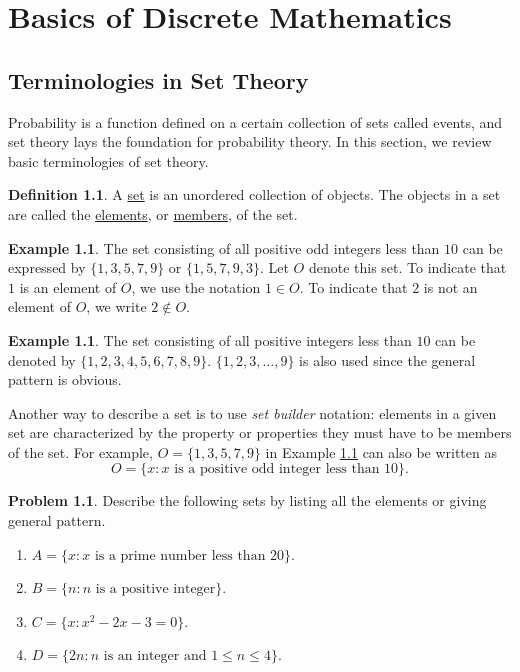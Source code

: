 \documentclass[12pt,letterpaper]{book}
\numberwithin{equation}{section}
\theoremstyle{definition}
\newtheorem{defi}[thm]{\textbf{Definition}}
\newtheorem{problem}[thm]{\textbf{Problem}}
\newtheorem{example}[thm]{\textbf{Example}}
\begin{document}
\chapter{Basics of Discrete Mathematics}

\section{Terminologies in Set Theory}

Probability is a function defined on a certain collection of sets called events, and set theory lays the foundation for probability theory. In this section, we review basic terminologies of set theory.

\begin{defi}
A \underline{set} is an unordered collection of objects. The objects in a set are called the \underline{elements}, or \underline{members}, of the set.
\end{defi}

\begin{example}\label{set O} The set consisting of all positive odd integers less than $10$ can be expressed by $\{1,3,5,7,9\}$ or $\{1,5,7,9,3\}$. Let $O$ denote this set. To indicate that $1$ is an element of $O$, we use the notation $1\in O$. To indicate that $2$ is not an element of $O$, we write $2\notin O$.
\end{example}

\begin{example} The set consisting of all positive integers less than $10$ can be denoted by $\{1,2,3,4,5,6,7,8,9\}$. $\{1,2,3,\ldots,9\}$ is also used since the general pattern is obvious.
\end{example}

Another way to describe a set is to use \textit{set builder} notation: elements in a given set are characterized by the property or properties they must have to be members of the set. For example, $O=\{1,3,5,7,9\}$ in Example \ref{set O} can also be written as $$O=\{x: x \text{ is a positive odd integer less than } 10\}.$$

\begin{problem} Describe the following sets by listing all the elements or giving general pattern.
\begin{enumerate}
\item $A=\{x: x \text{ is a prime number less than }20\}$.
\item $B=\{n: n \text{ is a positive integer}\}$.
\item $C=\{x: x^2-2x-3=0\}$.
\item $D=\{2n: n \text{ is an integer and }1\leq n\leq 4\}$.
\end{enumerate}
\end{problem}
\end{document}
